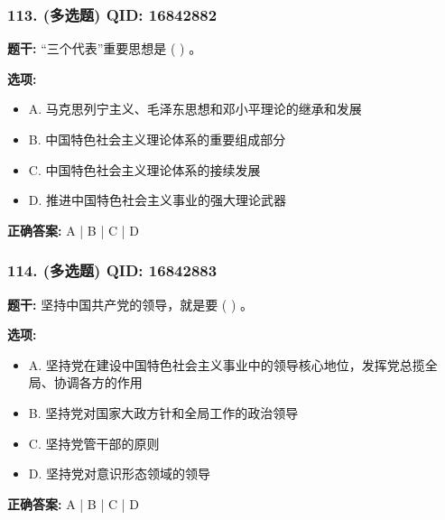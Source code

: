\documentclass[12pt,UTF8]{ctexart}
\begin{document}
\subsubsection*{113. (多选题) \small QID: 16842882}

\textbf{题干:}
“三个代表”重要思想是 ( ) 。

\textbf{选项:}
\begin{itemize}[leftmargin=*]

  \item A. 马克思列宁主义、毛泽东思想和邓小平理论的继承和发展

  \item B. 中国特色社会主义理论体系的重要组成部分

  \item C. 中国特色社会主义理论体系的接续发展

  \item D. 推进中国特色社会主义事业的强大理论武器

\end{itemize}

\textbf{正确答案:}
A | B | C | D

\vspace{0.3em}\hrulefill\vspace{0.7em}

\subsubsection*{114. (多选题) \small QID: 16842883}

\textbf{题干:}
坚持中国共产党的领导，就是要 ( ) 。

\textbf{选项:}
\begin{itemize}[leftmargin=*]

  \item A. 坚持党在建设中国特色社会主义事业中的领导核心地位，发挥党总揽全局、协调各方的作用

  \item B. 坚持党对国家大政方针和全局工作的政治领导

  \item C. 坚持党管干部的原则

  \item D. 坚持党对意识形态领域的领导

\end{itemize}

\textbf{正确答案:}
A | B | C | D

\vspace{0.3em}\hrulefill\vspace{0.7em}
\end{document}
